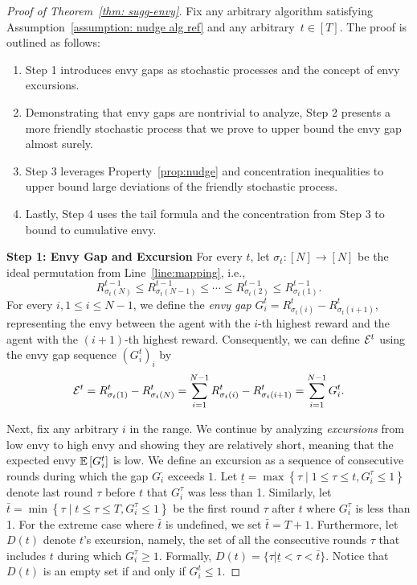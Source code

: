 \begin{proof}[Proof of Theorem~\ref{thm: sugg-envy}]
Fix any arbitrary algorithm satisfying  Assumption~\ref{assumption: nudge alg ref} and any arbitrary~$t \in [T]$. The proof is outlined as follows:
\begin{enumerate}
    \item Step 1 introduces envy gaps as stochastic processes and the concept of envy excursions.
    \item Demonstrating that envy gaps are nontrivial to analyze, Step 2 presents a more friendly stochastic process that we prove to upper bound the envy gap almost surely.
    \item Step 3 leverages Property~\ref{prop:nudge} and concentration inequalities to upper bound large deviations of the friendly stochastic process.
    \item Lastly, Step 4 uses the tail formula and the concentration from Step 3 to bound to cumulative envy.
\end{enumerate}
\textbf{Step 1: Envy Gap and Excursion}
For every $t$, let $\sigma_t: [N] \rightarrow [N]$ be the ideal permutation from Line~\ref{line:mapping}, i.e.,  
\[
R^{t-1}_{\sigma_t(N)} \leq  R^{t-1}_{\sigma_t(N-1)} \leq \cdots \leq R^{t-1}_{\sigma_t(2)} \leq R^{t-1}_{\sigma_t(1)} .
\]
For every $i, 1\leq i \leq N-1$, we define the \emph{envy gap} $G_i^t = R^t_{\sigma_t(i)} - R^t_{\sigma_t(i+1)}$, representing the envy between the agent with the $i$-th highest reward and the agent with the $(i+1)$-th highest reward.
Consequently, we can define $\mathcal{E}^t$ using the envy gap sequence $(G^t_i)_i$ by
\begin{equation}\label{eq:jknbvfbjj}
\mathcal{E}^t=R^t_{\sigma_t(1)}-R^t_{\sigma_t(N)}=\sum_{i=1}^{N-1} R^t_{\sigma_t(i)}-R^t_{\sigma_t(i+1)} = \sum_{i=1}^{N-1} G_i^t.   
\end{equation}

Next, fix any arbitrary $i$ in the range. We continue by analyzing \emph{excursions} from low envy to high envy and showing they are relatively short, meaning that the expected envy $\mathbb{E}\left[ G_i^t \right]$ is low. We define an excursion as a sequence of consecutive rounds during which the gap $G_i^\cdot$ exceeds $1$. 
Let $\underline{t} = \max{\left\{ \tau \mid 1 \leq \tau \leq t, G_i^{\tau} \leq 1 \right\}}$ denote last round $\tau$ before $t$ that $G_i^{\tau}$ was less than 1. Similarly,  let $\bar{t} = \min{\left\{ \tau \mid t\leq \tau \leq T, G_i^{\tau} \leq 1 \right\}}$ be the first round $\tau$ after $t$ where $G_i^{\tau}$ is less than 1. For the extreme case where $\bar{t}$ is undefined, we set $\bar{t} = T + 1$. Furthermore, let $D(t)$ denote $t$'s excursion, namely, the set of all the consecutive rounds $\tau$ that includes $t$ during which $G_i^\tau \geq 1$. Formally, $D(t) = \{\tau | \underline{t} < \tau < \bar{t}\}$. Notice that $D(t)$ is an empty set if and only if $G_i^t \leq 1$.


\end{proof}
